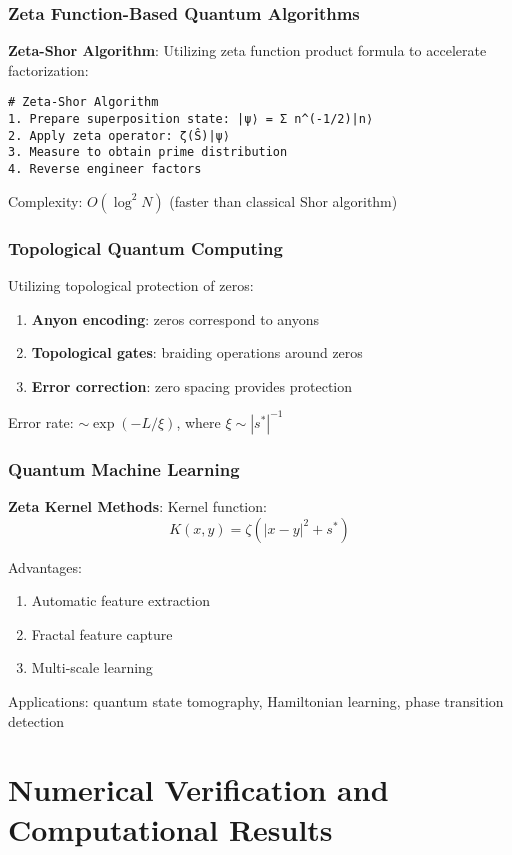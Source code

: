 \documentclass[11pt]{article}
\theoremstyle{plain}
\theoremstyle{definition}
\theoremstyle{remark}
\begin{document}
\subsubsection{Zeta Function-Based Quantum Algorithms}

\textbf{Zeta-Shor Algorithm}:
Utilizing zeta function product formula to accelerate factorization:

\begin{lstlisting}
# Zeta-Shor Algorithm
1. Prepare superposition state: |ψ⟩ = Σ n^(-1/2)|n⟩
2. Apply zeta operator: ζ(Ŝ)|ψ⟩
3. Measure to obtain prime distribution
4. Reverse engineer factors
\end{lstlisting}

Complexity: $O(\log^2 N)$ (faster than classical Shor algorithm)

\subsubsection{Topological Quantum Computing}

Utilizing topological protection of zeros:
\begin{enumerate}
\item \textbf{Anyon encoding}: zeros correspond to anyons
\item \textbf{Topological gates}: braiding operations around zeros
\item \textbf{Error correction}: zero spacing provides protection
\end{enumerate}

Error rate: $\sim \exp(-L/\xi)$, where $\xi \sim |s^*|^{-1}$

\subsubsection{Quantum Machine Learning}

\textbf{Zeta Kernel Methods}:
Kernel function:
$$K(x, y) = \zeta(|x - y|^2 + s^*)$$

Advantages:
\begin{enumerate}
\item Automatic feature extraction
\item Fractal feature capture
\item Multi-scale learning
\end{enumerate}

Applications: quantum state tomography, Hamiltonian learning, phase transition detection

\section{Numerical Verification and Computational Results}
\end{document}
